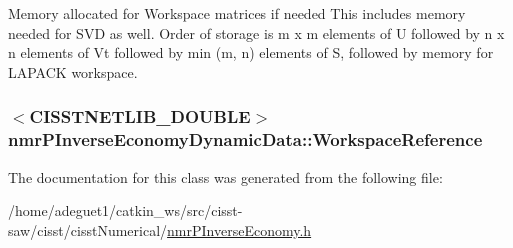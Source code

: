 Memory allocated for Workspace matrices if needed This includes memory needed for S\-V\-D as well. Order of storage is m x m elements of U followed by n x n elements of Vt followed by min (m, n) elements of S, followed by memory for L\-A\-P\-A\-C\-K workspace. \hypertarget{classnmr_p_inverse_economy_dynamic_data_a251cd42a2dcacbaa6920a08130026bf3}{
\subsubsection[{Workspace\-Reference}]{$<$C\-I\-S\-S\-T\-N\-E\-T\-L\-I\-B\-\_\-\-D\-O\-U\-B\-L\-E$>$ nmr\-P\-Inverse\-Economy\-Dynamic\-Data\-::\-Workspace\-Reference\hspace{0.3cm}{\ttfamily [protected]}}}\label{classnmr_p_inverse_economy_dynamic_data_a251cd42a2dcacbaa6920a08130026bf3}


The documentation for this class was generated from the following file\-:\begin{DoxyCompactItemize}
\item 
/home/adeguet1/catkin\-\_\-ws/src/cisst-\/saw/cisst/cisst\-Numerical/\hyperlink{nmr_p_inverse_economy_8h}{nmr\-P\-Inverse\-Economy.\-h}\end{DoxyCompactItemize}
